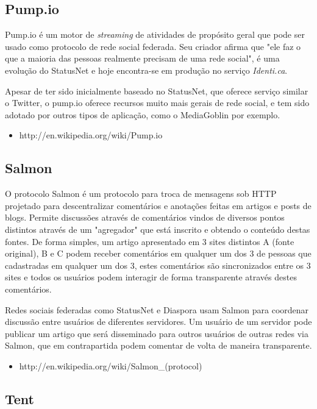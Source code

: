 \documentclass[12pt]{article}
\begin{document}
\subsection{Pump.io}

Pump.io é um motor de {\it streaming} de atividades de propósito geral que
pode ser usado como protocolo de rede social federada. Seu criador afirma que
"ele faz o que a maioria das pessoas realmente precisam de uma rede social", é
uma evolução do StatusNet e hoje encontra-se em produção no serviço {\it
Identi.ca}.

Apesar de ter sido inicialmente baseado no StatusNet, que oferece serviço
similar o Twitter, o pump.io oferece recursos muito mais gerais de rede
social, e tem sido adotado por outros tipos de aplicação, como o MediaGoblin
por exemplo.

\begin{itemize}
  \item http://en.wikipedia.org/wiki/Pump.io
\end{itemize}

\subsection{Salmon}

O protocolo Salmon é um protocolo para troca de mensagens sob HTTP projetado
para descentralizar comentários e anotações feitas em artigos e posts de
blogs. Permite discussões através de comentários vindos de diversos pontos
distintos através de um "agregador" que está inscrito e obtendo o conteúdo
destas fontes. De forma simples, um artigo apresentado em 3 sites distintos A
(fonte original), B e C podem receber comentários em qualquer um dos 3 de
pessoas que cadastradas em qualquer um dos 3, estes comentários são
sincronizados entre os 3 sites e todos os usuários podem interagir de forma
transparente através destes comentários.

Redes sociais federadas como StatusNet e Diaspora usam Salmon para coordenar
discussão entre usuários de diferentes servidores. Um usuário de um servidor
pode publicar um artigo que será disseminado para outros usuários de outras
redes via Salmon, que em contrapartida podem comentar de volta de maneira
transparente.

\begin{itemize}
  \item http://en.wikipedia.org/wiki/Salmon\_(protocol)
\end{itemize}

\subsection{Tent}
\end{document}
